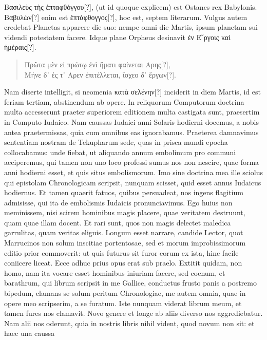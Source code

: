 \textgreek{Βασιλεὺς τὴς ἑπταφθόγγου[?]},
 (ut id quoque explicem) est Ostanes rex Babylonis.
\textgreek{Βαβυλὼν[?]} enim est \textgreek{ἑπτάφθογγος[?]},
 hoc est, septem literarum.
Vulgus autem credebat Planetas apparere die suo: nempe omni
die Martis, ipsum planetam sui videndi potestatem facere.
Idque plane Orpheus desinavit \textgreek{ἑν Ε῎ργοις καὶ ἡμέραις[?]}.
\begin{verse}
 \textgreek{Πρῶτα μὲν εἰ πρώτῳ ἐνὶ ἤματι φαίνεται Αρης[?]},\\
 \textgreek{Μήνε δ᾽ ἐς τ᾽ Αρεν ἐπιτέλλεται, ἴσχεο δ᾽ ἔργων[?]}.
\end{verse}
Nam diserte intelligit, si neomenia
 \textgreek{κατὰ σελένην[?]} inciderit in diem
Martis, id est feriam tertiam, abstinendum ab opere.
In reliquorum
Computorum doctrina multa accesserunt praeter superiorem editionem
multa castigata sunt, praesertim in Computo Iudaico.
Nam
caussas Iudaici anni Solaris hodierni docemus, a nobis antea praetermissas,
quia cum omnibus eas ignorabamus.
Praeterea damnavimus sententiam nostram de Tekupharum sede,
 quas in prisca
mundi epocha collocabamus: unde fiebat, ut aliquando annum
embolimum pro communi acciperemus, qui tamen non uno loco
professi sumus nos non nescire, quae forma anni hodierni esset, et
quis situs embolismorum.
Imo sine doctrina mea ille sciolus qui
epistolam Chronologicam scripsit, nunquam scisset, quid esset
annus Iudaicus hodiernus.
Et tamen quaerit fatuos, quibus persuadeat,
nos ingens flagitium admisisse, qui ita de embolismis Iudaicis
pronunciavimus.
Ego huius non meminissem, nisi scirem hominibus
magis placere, quae veritatem destruunt, quam quae illam docent.
Et rari sunt, quos non magis delectet maledica garrulitas,
quam veritas eliguis.
Longum esset narrare, candide Lector,
quot Marrucinos non solum inscitiae portentosae, sed et morum
improbissimorum editio prior commoverit: ut quis futurus sit furor
eorum ex ista, hinc facile coniicere liceat.
Ecce adhuc prius opus erat sub praelo.
Extitit quidam, non homo, nam ita vocare esset
hominibus iniuriam facere, sed coenum, et barathrum, qui librum
scripsit in me Gallice, conductus frusto panis a postremo bipedum,
clamans se solum peritum Chronologiae, me autem omnia, quae
in opere meo scripserim, a se furatum.
Iste nunquam viderat librum
meum, et tamen fures nos clamavit.
Novo genere et longe ab
aliis diverso nos aggrediebatur.
Nam alii nos oderunt, quia in
nostris libris nihil vident, quod novum non sit: et haec una caussa
